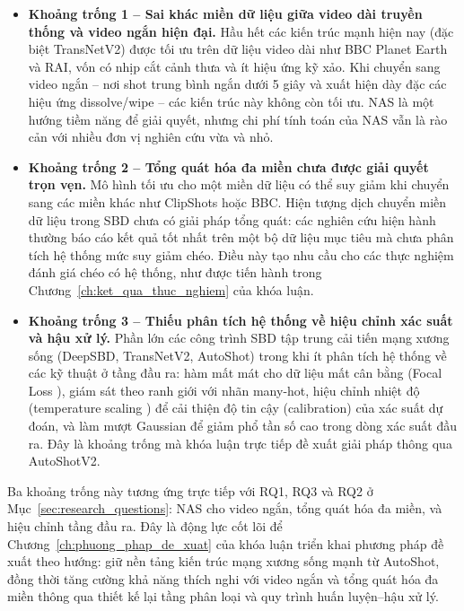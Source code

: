 \begin{itemize}
    \item \textbf{Khoảng trống 1 -- Sai khác miền dữ liệu giữa video dài truyền thống và video ngắn hiện đại.} Hầu hết các kiến trúc mạnh hiện nay (đặc biệt TransNetV2) được tối ưu trên dữ liệu video dài như BBC Planet Earth và RAI, vốn có nhịp cắt cảnh thưa và ít hiệu ứng kỹ xảo. Khi chuyển sang video ngắn -- nơi shot trung bình ngắn dưới 5 giây và xuất hiện dày đặc các hiệu ứng dissolve/wipe -- các kiến trúc này không còn tối ưu. NAS là một hướng tiềm năng để giải quyết, nhưng chi phí tính toán của NAS vẫn là rào cản với nhiều đơn vị nghiên cứu vừa và nhỏ.
 
    \item \textbf{Khoảng trống 2 -- Tổng quát hóa đa miền chưa được giải quyết trọn vẹn.} Mô hình tối ưu cho một miền dữ liệu có thể suy giảm khi chuyển sang các miền khác như ClipShots hoặc BBC. Hiện tượng dịch chuyển miền dữ liệu trong SBD chưa có giải pháp tổng quát: các nghiên cứu hiện hành thường báo cáo kết quả tốt nhất trên một bộ dữ liệu mục tiêu mà chưa phân tích hệ thống mức suy giảm chéo. Điều này tạo nhu cầu cho các thực nghiệm đánh giá chéo có hệ thống, như được tiến hành trong Chương~\ref{ch:ket_qua_thuc_nghiem} của khóa luận.
 
    \item \textbf{Khoảng trống 3 -- Thiếu phân tích hệ thống về hiệu chỉnh xác suất và hậu xử lý.} Phần lớn các công trình SBD tập trung cải tiến mạng xương sống (DeepSBD, TransNetV2, AutoShot) trong khi ít phân tích hệ thống về các kỹ thuật ở tầng đầu ra: hàm mất mát cho dữ liệu mất cân bằng (Focal Loss \cite{Lin2017FocalLoss}), giám sát theo ranh giới với nhãn many-hot, hiệu chỉnh nhiệt độ (temperature scaling \cite{Guo2017Calibration}) để cải thiện độ tin cậy (calibration) của xác suất dự đoán, và làm mượt Gaussian để giảm phổ tần số cao trong dòng xác suất đầu ra. Đây là khoảng trống mà khóa luận trực tiếp đề xuất giải pháp thông qua AutoShotV2.
\end{itemize}
 
\noindent
Ba khoảng trống này tương ứng trực tiếp với RQ1, RQ3 và RQ2 ở Mục~\ref{sec:research_questions}: NAS cho video ngắn, tổng quát hóa đa miền, và hiệu chỉnh tầng đầu ra. Đây là động lực cốt lõi để Chương~\ref{ch:phuong_phap_de_xuat} của khóa luận triển khai phương pháp đề xuất theo hướng: giữ nền tảng kiến trúc mạng xương sống mạnh từ AutoShot, đồng thời tăng cường khả năng thích nghi với video ngắn và tổng quát hóa đa miền thông qua thiết kế lại tầng phân loại và quy trình huấn luyện--hậu xử lý.

